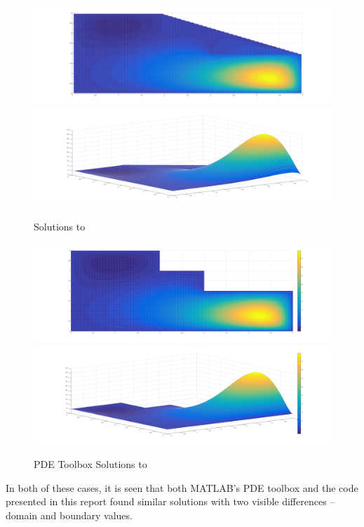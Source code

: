 \documentclass[10pt,a4paper]{article}
\begin{document}
\begin{figure}[H]
\includegraphics[width=\linewidth]{figures/cubic-top.png}
\includegraphics[width=\linewidth]{figures/cubic-iso.png}
\caption{Solutions to }
\label{fig: cubic solutions}
\end{figure}

\begin{figure}[H]
\includegraphics[width=\linewidth]{figures/cubic-top-pdetool.png}
\includegraphics[width=\linewidth]{figures/cubic-iso-pdetool.png}
\caption{PDE Toolbox Solutions to }
\label{fig: pdetool cubic solutions}
\end{figure}

In both of these cases, it is seen that both MATLAB's PDE toolbox and the code presented in this report found similar solutions with two visible differences -- domain and boundary values.
\end{document}
